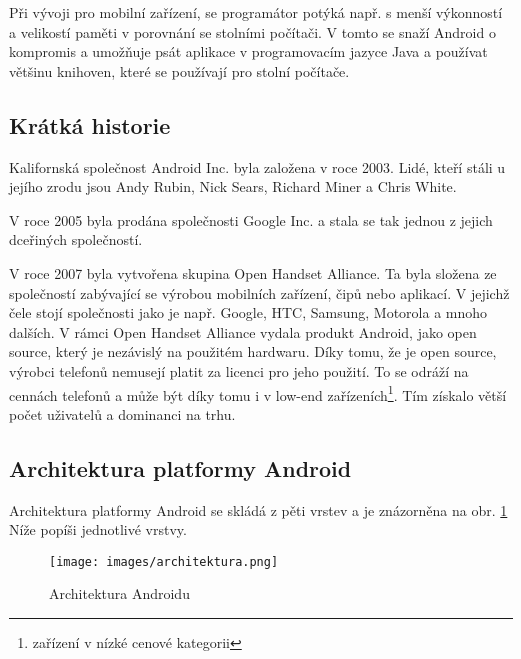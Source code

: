 \documentclass[12pt]{article}
\begin{document}
Při vývoji pro mobilní zařízení, se programátor potýká např. s menší výkonností a velikostí paměti v porovnání se stolními počítači. V tomto se snaží Android o kompromis a umožňuje psát aplikace v programovacím jazyce Java a používat většinu knihoven, které se používají pro stolní počítače.
\subsection{Krátká historie}
Kalifornská společnost Android Inc. byla založena v roce 2003. Lidé, kteří stáli u jejího zrodu jsou Andy Rubin, Nick Sears, Richard Miner a Chris White.

V roce 2005 byla prodána společnosti Google Inc. a stala se tak jednou z jejich dceřiných společností.\cite{historie}

 V roce 2007 byla vytvořena skupina Open Handset Alliance. Ta byla složena ze společností zabývající se výrobou mobilních zařízení, čipů nebo aplikací. V jejichž čele stojí společnosti jako je např. Google, HTC, Samsung, Motorola a mnoho dalších. V rámci Open Handset Alliance vydala produkt Android, jako open source, který je nezávislý na použitém hardwaru. Díky tomu, že je open source, výrobci telefonů nemusejí platit za licenci pro jeho použití. To se odráží na cennách telefonů a může být díky tomu i v low-end zařízeních\footnote[1]{zařízení v nízké cenové kategorii}. Tím získalo větší počet uživatelů a dominanci na trhu.
 
\newpage
\subsection{Architektura platformy Android}
Architektura platformy Android se skládá z pěti vrstev a je znázorněna na obr. \ref{architektura} Níže popíši jednotlivé vrstvy.
\begin{figure}[ht]
\centerline{\texttt{[image: images/architektura.png]}}
\caption{Architektura Androidu\cite{architektura}} \label{architektura}
\end{figure}
\end{document}
